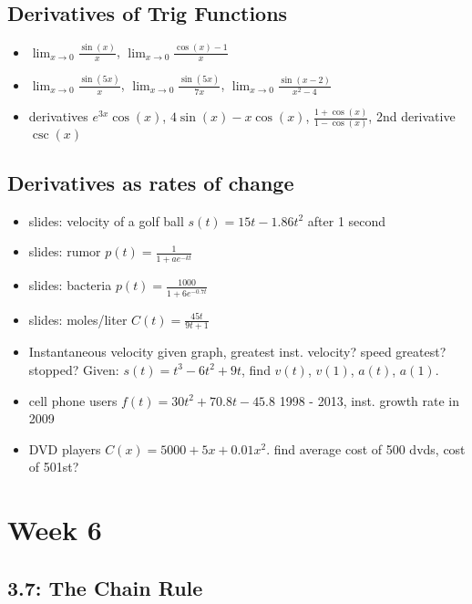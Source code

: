 \documentclass[11pt]{article}
\begin{document}
\subsection{Derivatives of Trig Functions}
\begin{itemize}
	\item $\lim_{x\to0} \frac{\sin(x)}{x}$, $\lim_{x\to 0} \frac{\cos(x) - 1}{x}$
	\item $\lim_{x \to 0} \frac{\sin(5x)}{x}$, $\lim_{x \to 0} \frac{\sin(5x)}{7x}$, $\lim_{x \to 0} \frac{\sin(x-2)}{x^2 - 4}$
	\item derivatives $e^{3x}\cos(x)$, $4\sin(x) - x\cos(x)$, $\frac{1+\cos(x)}{1-\cos(x)}$, 2nd derivative $\csc(x)$
\end{itemize}


\subsection{Derivatives as rates of change}
\begin{itemize}
	\item slides: velocity of a golf ball $s(t) = 15t - 1.86t^2$ after 1 second
	\item slides: rumor $p(t) = \frac{1}{1+ae^{-kt}}$
	\item slides: bacteria $p(t) = \frac{1000}{1+6e^{-0.7t}}$
	\item slides: moles/liter $C(t) = \frac{45t}{9t+1}$
	\item Instantaneous velocity given graph, greatest inst. velocity? speed greatest? stopped? Given: $s(t) = t^3 - 6t^2 + 9t$, find $v(t)$, $v(1)$, $a(t)$, $a(1)$.
	\item cell phone users $f(t) = 30t^2 + 70.8t - 45.8$ 1998 - 2013, inst. growth rate in 2009
	\item DVD players $C(x) = 5000 + 5x + 0.01x^2$.  find average cost of 500 dvds, cost of 501st?
\end{itemize}	





\section*{Week 6}

\subsection{3.7: The Chain Rule}
\end{document}

